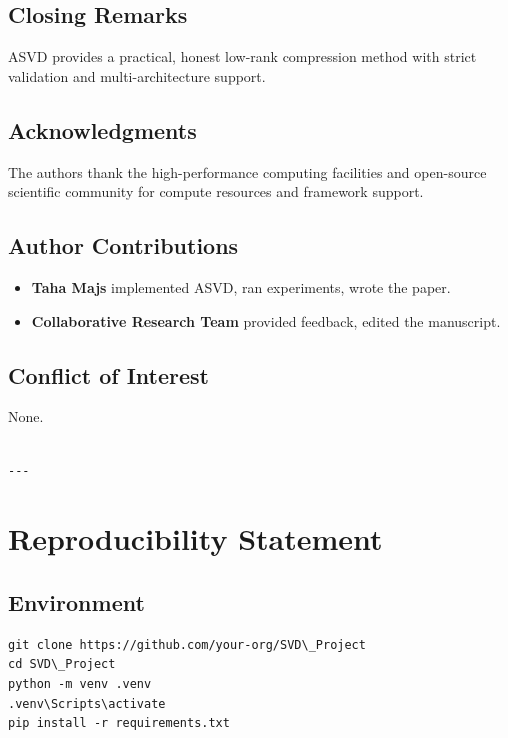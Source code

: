 \subsection{Closing Remarks}

ASVD provides a practical, honest low-rank compression method with strict 
validation and multi-architecture support.

\subsection{Acknowledgments}

The authors thank the high-performance computing facilities and open-source scientific community for compute resources and framework support.

\subsection{Author Contributions}

\begin{itemize}
\item \textbf{Taha Majs} implemented ASVD, ran experiments, wrote the paper.
\item \textbf{Collaborative Research Team} provided feedback, edited the manuscript.

\end{itemize}
\subsection{Conflict of Interest}

None.
\begin{lstlisting}

---
\end{lstlisting}


\section{Reproducibility Statement}

\subsection{Environment}

\begin{lstlisting}
git clone https://github.com/your-org/SVD\_Project
cd SVD\_Project
python -m venv .venv
.venv\Scripts\activate
pip install -r requirements.txt
\end{lstlisting}

